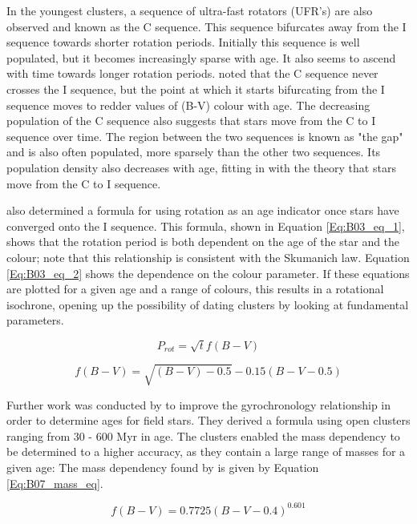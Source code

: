 In the youngest clusters, a sequence of ultra-fast rotators (UFR's) are also observed and known as the C sequence. This sequence bifurcates away from the I sequence towards shorter rotation periods. Initially this sequence is well populated, but it becomes increasingly sparse with age. It also seems to ascend with time towards longer rotation periods. \citet{Barnes_2003} noted that the C sequence never crosses the I sequence, but the point at which it starts bifurcating from the I sequence moves to redder values of (B-V) colour with age. The decreasing population of the C sequence also suggests that stars move from the C to I sequence over time. The region between the two sequences is known as "the gap" and is also often populated, more sparsely than the other two sequences. Its population density also decreases with age, fitting in with the theory that stars move from the C to I sequence.

\citet{Barnes_2003} also determined a formula for using rotation as an age indicator once stars have converged onto the I sequence. This formula, shown in Equation \ref{Eq:B03_eq_1}, shows that the rotation period is both dependent on the age of the star and the colour; note that this relationship is consistent with the Skumanich law. Equation \ref{Eq:B03_eq_2} shows the dependence on the colour parameter. If these equations are plotted for a given age and a range of colours, this results in a rotational isochrone, opening up the possibility of dating clusters by looking at fundamental parameters.

\begin{equation}
    P_{rot} = \sqrt{t}f(B-V)
    \label{Eq:B03_eq_1}
\end{equation}

\begin{equation}
    f(B-V) = \sqrt{(B-V) -0.5} - 0.15(B-V-0.5)
    \label{Eq:B03_eq_2}
\end{equation}

Further work was conducted by \citet{Barnes_2007} to improve the gyrochronology relationship in order to determine ages for field stars. They derived a formula using open clusters ranging from 30 - 600 Myr in age. The clusters enabled the mass dependency to be determined to a higher accuracy, as they contain a large range of masses for a given age: The mass dependency found by \citet{Barnes_2007} is given by Equation \ref{Eq:B07_mass_eq}.

\begin{equation}
    f(B-V) = 0.7725(B-V-0.4)^{0.601}
    \label{Eq:B07_mass_eq}
\end{equation}

